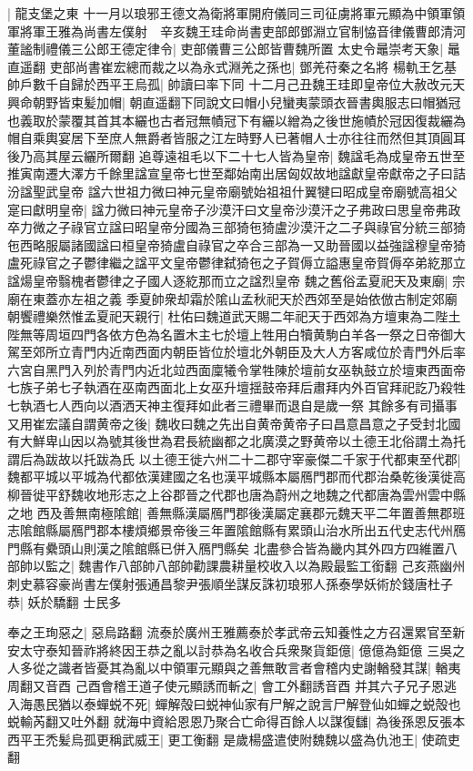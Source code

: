 |{
	龍支堡之東}
十一月以琅邪王德文為衛將軍開府儀同三司征虜將軍元顯為中領軍領軍將軍王雅為尚書左僕射　辛亥魏王珪命尚書吏部郎鄧淵立官制恊音律儀曹郎清河董謐制禮儀三公郎王德定律令|{
	吏部儀曹三公郎皆曹魏所置}
太史令鼂崇考天象|{
	鼂直遥翻}
吏部尚書崔宏總而裁之以為永式淵羌之孫也|{
	鄧羌苻秦之名將}
楊軌王乞基帥戶數千自歸於西平王烏孤|{
	帥讀曰率下同}
十二月己丑魏王珪即皇帝位大赦改元天興命朝野皆束髪加帽|{
	朝直遥翻下同說文曰帽小兒蠻夷蒙頭衣晉書輿服志曰帽猶冠也義取於蒙覆其首其本纚也古者冠無幘冠下有纚以繒為之後世施幘於冠因復裁纚為帽自乘輿宴居下至庶人無爵者皆服之江左時野人已著帽人士亦往往而然但其頂圓耳後乃高其屋云纚所爾翻}
追尊遠祖毛以下二十七人皆為皇帝|{
	魏諡毛為成皇帝五世至推寅南遷大澤方千餘里諡宣皇帝七世至鄰始南出居匈奴故地諡獻皇帝獻帝之子曰詰汾諡聖武皇帝}
諡六世祖力微曰神元皇帝廟號始祖祖什翼犍曰昭成皇帝廟號高祖父寔曰獻明皇帝|{
	諡力微曰神元皇帝子沙漠汗曰文皇帝沙漠汗之子弗政曰思皇帝弗政卒力微之子祿官立諡曰昭皇帝分國為三部猗㐌猗盧沙漠汗之二子與祿官分統三部猗㐌西略服屬諸國諡曰桓皇帝猗盧自祿官之卒合三部為一又助晉國以益強諡穆皇帝猗盧死祿官之子鬱律繼之諡平文皇帝鬱律弑猗㐌之子賀傉立謚惠皇帝賀傉卒弟紇那立諡煬皇帝翳槐者鬱律之子國人逐紇那而立之諡烈皇帝}
魏之舊俗孟夏祀天及東廟|{
	宗廟在東蓋亦左祖之義}
季夏帥衆却霜於隂山孟秋祀天於西郊至是始依倣古制定郊廟朝饗禮樂然惟孟夏祀天親行|{
	杜佑曰魏道武天賜二年祀天于西郊為方壇東為二陛土陛無等周垣四門各依方色為名置木主七於壇上牲用白犢黄駒白羊各一祭之日帝御大駕至郊所立青門内近南西面内朝臣皆位於壇北外朝臣及大人方客咸位於青門外后率六宮自黑門入列於青門内近北竝西面廩犧令掌牲陳於壇前女巫執鼓立於壇東西面帝七族子弟七子執酒在巫南西面北上女巫升壇揺鼓帝拜后肅拜内外百官拜祀訖乃殺牲七執酒七人西向以酒洒天神主復拜如此者三禮畢而退自是歲一祭}
其餘多有司攝事又用崔宏議自謂黄帝之後|{
	魏收曰魏之先出自黄帝黄帝子曰昌意昌意之子受封北國有大鮮卑山因以為號其後世為君長統幽都之北廣漠之野黄帝以土德王北俗謂土為托謂后為跋故以托跋為氏}
以土德王徙六州二十二郡守宰豪傑二千家于代都東至代郡|{
	魏都平城以平城為代都依漢建國之名也漢平城縣本屬鴈門郡而代郡治桑乾後漢徙高柳晉徙平舒魏收地形志之上谷郡晉之代郡也唐為蔚州之地魏之代都唐為雲州雲中縣之地}
西及善無南極隂館|{
	善無縣漢屬鴈門郡後漢屬定襄郡元魏天平二年置善無郡班志隂館縣屬鴈門郡本樓煩鄉景帝後三年置隂館縣有累頭山治水所出五代史志代州鴈門縣有纍頭山則漢之隂館縣已併入鴈門縣矣}
北盡參合皆為畿内其外四方四維置八部帥以監之|{
	魏書作八部帥八部帥勸課農耕量校收入以為殿最監工銜翻}
己亥燕幽州刺史慕容豪尚書左僕射張通昌黎尹張順坐謀反誅初琅邪人孫泰學妖術於錢唐杜子恭|{
	妖於驕翻}
士民多

奉之王珣惡之|{
	惡烏路翻}
流泰於廣州王雅薦泰於孝武帝云知養性之方召還累官至新安太守泰知晉祚將終因王恭之亂以討恭為名收合兵衆聚貨鉅億|{
	億億為鉅億}
三吳之人多從之識者皆憂其為亂以中領軍元顯與之善無敢言者會稽内史謝輶發其謀|{
	輶夷周翻又音酉}
己酉會稽王道子使元顯誘而斬之|{
	會工外翻誘音酉}
并其六子兄子恩逃入海愚民猶以泰蟬蜕不死|{
	蟬解殻曰蜕神仙家有尸解之說言尸解登仙如蟬之蜕殻也蜕輸芮翻又吐外翻}
就海中資給恩恩乃聚合亡命得百餘人以謀復讎|{
	為後孫恩反張本}
西平王禿髪烏孤更稱武威王|{
	更工衡翻}
是歲楊盛遣使附魏魏以盛為仇池王|{
	使疏吏翻}


